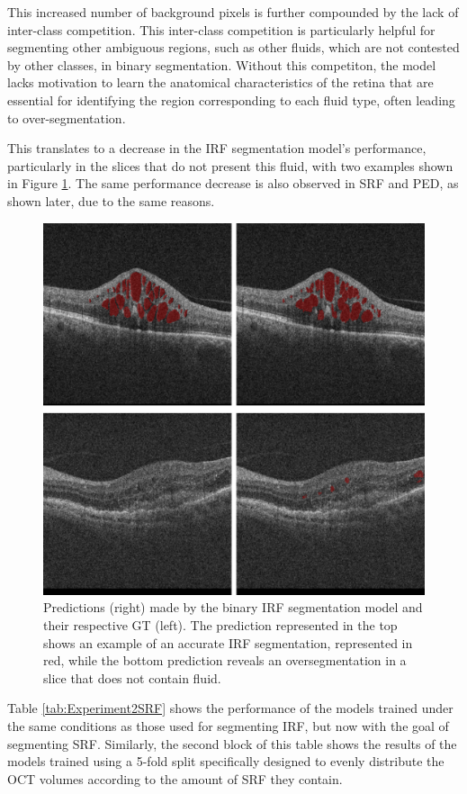 \par
This increased number of background pixels is further compounded by the lack of inter-class competition. This inter-class competition is particularly helpful for segmenting other ambiguous regions, such as other fluids, which are not contested by other classes, in binary segmentation. Without this competiton, the model lacks motivation to learn the anatomical characteristics of the retina that are essential for identifying the region corresponding to each fluid type, often leading to over-segmentation. 
\par
This translates to a decrease in the IRF segmentation model's performance, particularly in the slices that do not present this fluid, with two examples shown in Figure \ref{fig:Experiment2IRFSegmentation}. The same performance decrease is also observed in SRF and PED, as shown later, due to the same reasons.
\begin{figure}[b]
	\centering
	\includegraphics[width=0.7\linewidth]{figures/Experiment2IRFSegmentation.png}
	\caption{Predictions (right) made by the binary IRF segmentation model and their respective GT (left). The prediction represented in the top shows an example of an accurate IRF segmentation, represented in red, while the bottom prediction reveals an oversegmentation in a slice that does not contain fluid.}
	\label{fig:Experiment2IRFSegmentation}
\end{figure}

Table \ref{tab:Experiment2SRF} shows the performance of the models trained under the same conditions as those used for segmenting IRF, but now with the goal of segmenting SRF. Similarly, the second block of this table shows the results of the models trained using a 5-fold split specifically designed to evenly distribute the OCT volumes according to the amount of SRF they contain.

